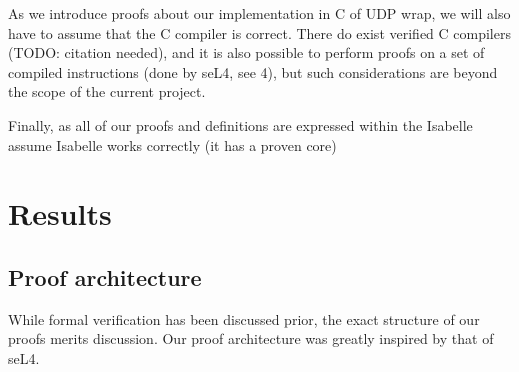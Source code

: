 \documentclass[twoside]{memoir}
\begin{document}
As we introduce proofs about our implementation in C of UDP wrap,
we will also have to assume that the C compiler is correct.
There do exist verified C compilers (TODO: citation needed),
and it is also possible to perform proofs on a set of compiled instructions
(done by seL4, see \cite{Klein2014Verification}{4}),
but such considerations are beyond the scope of the current project.

Finally, as all of our proofs and definitions are expressed within the Isabelle 
assume Isabelle works correctly (it has a proven core)

\chapter{Results}
\section{Proof architecture}
While formal verification has been discussed prior,
the exact structure of our proofs merits discussion.
Our proof architecture was greatly inspired by that of seL4.
\end{document}
